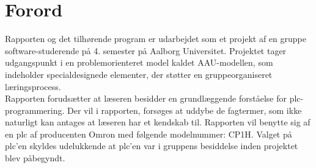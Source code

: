 \section*{Forord}
\label{sec:forord}
Rapporten og det tilhørende program er udarbejdet som et projekt af en gruppe software-studerende på 4. semester på Aalborg Universitet. Projektet tager udgangspunkt i en problemorienteret model kaldet AAU-modellen, som indeholder specialdesignede elementer, der støtter en gruppeorganiseret læringsprocess. \\

\noindent Rapporten forudsætter at læseren besidder en grundlæggende forståelse for \gls{plc}-programmering. Der vil i rapporten, forsøges at uddybe de fagtermer, som ikke naturligt kan antages at læseren har et kendskab til. Rapporten vil benytte sig af en \gls{plc} af producenten Omron med følgende modelnummer: CP1H. Valget på \gls{plc}'en skyldes udelukkende at \gls{plc}'en var i gruppens besiddelse inden projektet blev påbegyndt.